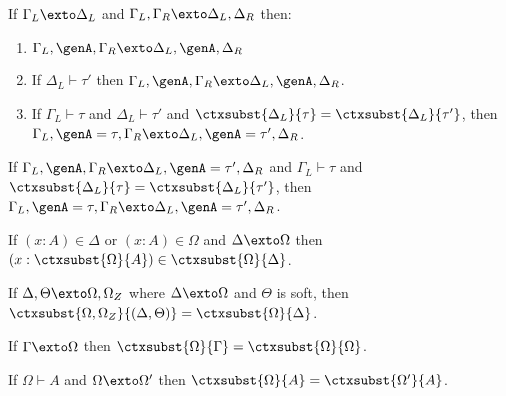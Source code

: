 \begin{mlemma}
  If $\Gamma_L \exto \Delta_L$ and $\Gamma_L, \Gamma_R \exto \Delta_L, \Delta_R$ then:
  \begin{enumerate}
  \item $\Gamma_L, \genA, \Gamma_R \exto \Delta_L, \genA, \Delta_R$
  \item If $\Delta_L \vdash \tau'$ then $\Gamma_L, \genA, \Gamma_R \exto \Delta_L, \genA, \Delta_R$.
  \item If $\Gamma_L \vdash \tau$ and $\Delta_L \vdash \tau'$ and $\ctxsubst{\Delta_L}{\tau} = \ctxsubst{\Delta_L}{\tau'}$, then $\Gamma_L, \genA = \tau, \Gamma_R \exto \Delta_L, \genA = \tau', \Delta_R$.
  \end{enumerate}
  \label{lemma:paralell_admit}
\end{mlemma}

\begin{mlemma}
  If $\Gamma_L, \genA, \Gamma_R \exto \Delta_L, \genA = \tau', \Delta_R$ and
  $\Gamma_L \vdash \tau$ and $\ctxsubst{\Delta_L}{\tau} =
  \ctxsubst{\Delta_L}{\tau'}$, then $\Gamma_L, \genA = \tau, \Gamma_R \exto
  \Delta_L, \genA = \tau', \Delta_R$.

 \label{lemma:solved_var_add_ext}
\end{mlemma}


\begin{mlemma}
  If $(x : A) \in \Delta$ or $(x : A) \in \Omega$ and $\Delta \exto \Omega$ then $(x : \ctxsubst{\Omega}{A}) \in \ctxsubst{\Omega}{\Delta}$.
  \label{lemma:variable_preservation}
\end{mlemma}

\begin{mlemma}
  If $\Delta, \Theta \exto \Omega, \Omega_Z$ where $\Delta \exto \Omega$ and $\Theta$ is soft, then $\ctxsubst{\Omega, \Omega_Z}{(\Delta, \Theta)} = \ctxsubst{\Omega}{\Delta}$.
  \label{lemma:subst_go_away}
\end{mlemma}


\begin{mlemma}
  If $\Gamma \exto \Omega$ then $\ctxsubst{\Omega}{\Gamma} = \ctxsubst{\Omega}{\Omega}$.
  \label{lemma:stable_complete_ctxt}
\end{mlemma}

\begin{mlemma}
  If $\Omega \vdash A$ and $\Omega \exto \Omega'$ then $\ctxsubst{\Omega}{A} = \ctxsubst{\Omega'}{A}$.
  \label{lemma:finish_types}
\end{mlemma}


